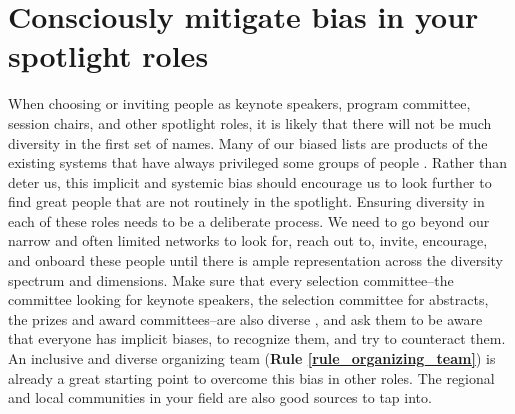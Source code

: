 \documentclass[10pt,letterpaper]{article}
\begin{document}
\section{Consciously mitigate bias in your spotlight roles}
\label{rule_unbias}

When choosing or inviting people as keynote speakers, program committee, session chairs, and other spotlight roles, it is likely that there will not be much diversity in the first set of names. 
Many of our biased lists are products of the existing systems that have always privileged some groups of people \cite{dwyerNoticeWhoScience2021,swartzScienceValueDiversity2019,wongBuildDiversityScience2020,dignazioUnicornsJanitorsNinjas2020}. 
Rather than deter us, this implicit and systemic bias should encourage us to look further to find great people that are not routinely in the spotlight. 
Ensuring diversity in each of these roles needs to be a deliberate process. 
We need to go beyond our narrow and often limited networks to look for, reach out to, invite, encourage, and onboard these people until there is ample representation across the diversity spectrum and dimensions. 
Make sure that every selection committee--the committee looking for keynote speakers, the selection committee for abstracts, the prizes and award committees--are also diverse \cite{swartzScienceValueDiversity2019, wongBuildDiversityScience2020}, and ask them to be aware that everyone has implicit biases, to recognize them, and try to counteract them. 
An inclusive and diverse organizing team (\textbf{Rule \ref{rule_organizing_team}}) is already a great starting point to overcome this bias in other roles. The regional and local communities in your field are also good sources to tap into. 
\end{document}
